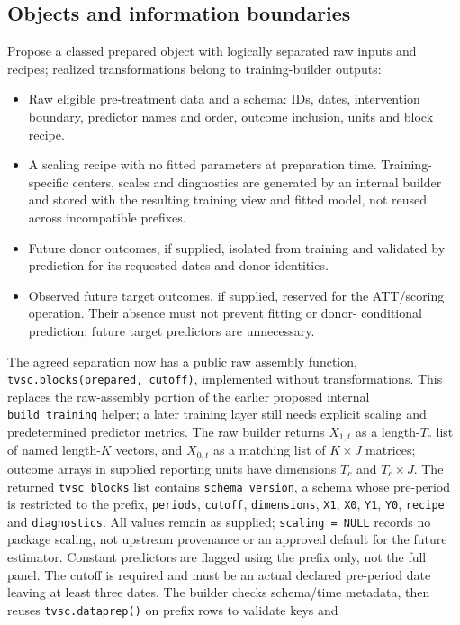 \documentclass[11pt]{article}
\begin{document}
\subsection{Objects and information boundaries}
Propose a classed prepared object with logically separated raw inputs and
recipes; realized transformations belong to training-builder outputs:
\begin{itemize}
\item Raw eligible pre-treatment data and a schema: IDs, dates, intervention
boundary, predictor names and order, outcome inclusion, units and block recipe.
\item A scaling recipe with no fitted parameters at preparation time.
Training-specific centers, scales and diagnostics are generated by an
internal builder and stored with the resulting training view and fitted
model, not reused across incompatible prefixes.
\item Future donor outcomes, if supplied, isolated from training and
validated by prediction for its requested dates and donor identities.
\item Observed future target outcomes, if supplied, reserved for the
ATT/scoring operation. Their absence must not prevent fitting or donor-
conditional prediction; future target predictors are unnecessary.
\end{itemize}
The agreed separation now has a public raw assembly function,
\texttt{tvsc.blocks(prepared, cutoff)}, implemented without transformations.
This replaces the raw-assembly portion of the earlier proposed internal
\texttt{build\_training} helper; a later training layer still needs explicit
scaling and predetermined predictor metrics. The raw builder returns
$X_{1,t}$ as a length-$T_c$ list of named length-$K$ vectors, and
$X_{0,t}$ as a matching list of $K\times J$ matrices; outcome arrays in
supplied reporting units have dimensions $T_c$ and $T_c\times J$. The returned
\texttt{tvsc\_blocks} list contains \texttt{schema\_version}, a schema whose
pre-period is restricted to the prefix, \texttt{periods}, \texttt{cutoff},
\texttt{dimensions}, \texttt{X1}, \texttt{X0}, \texttt{Y1}, \texttt{Y0},
\texttt{recipe} and \texttt{diagnostics}. All values remain as supplied;
\texttt{scaling = NULL} records no package scaling, not upstream provenance
or an approved default for the future estimator.
Constant predictors are flagged using the prefix only, not the full panel.
The cutoff is required and must be an actual declared pre-period date
leaving at least three dates. The builder checks schema/time metadata,
then reuses \texttt{tvsc.dataprep()} on prefix rows to validate keys and
\end{document}
